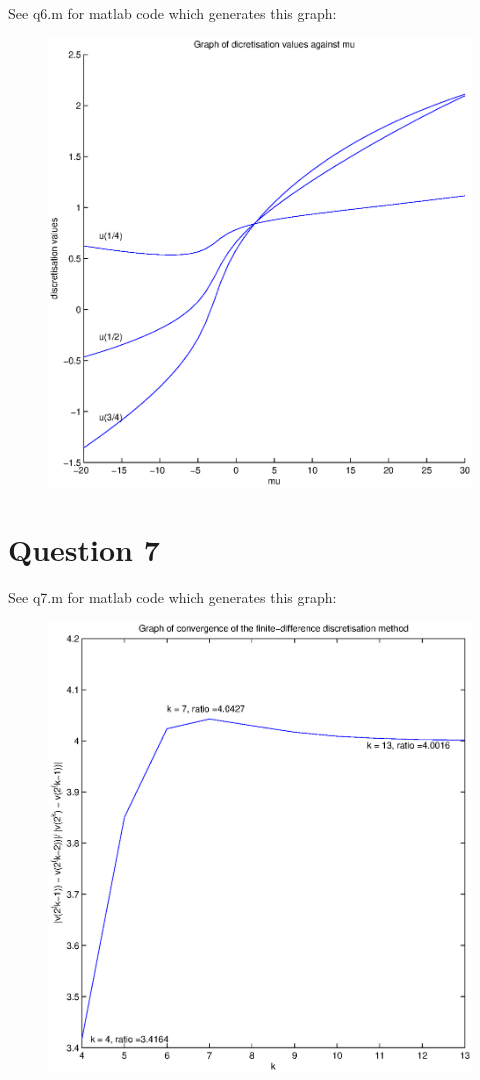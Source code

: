\documentclass[fleqn]{report}
\begin{document}
See q6.m for matlab code which generates this graph:
\begin{figure}[h!]
\begin{center}
    \centerline{\includegraphics[width=1.0\textwidth]{graphs/q6.eps}}
\end{center}
\end{figure}

\newpage
\section{Question 7}
See q7.m for matlab code which generates this graph:
\begin{figure}[h!]
\begin{center}
    \centerline{\includegraphics[width=1.0\textwidth]{graphs/q7.eps}}
\end{center}
\end{figure}
\end{document}
